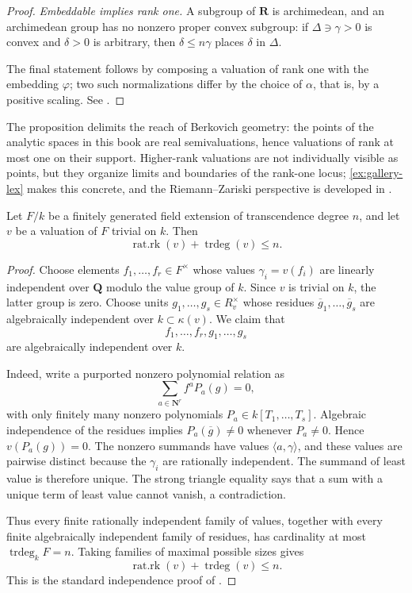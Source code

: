 \begin{proof}
\emph{Embeddable implies rank one.} A subgroup of $\mathbf R$ is
archimedean, and an archimedean group has no nonzero proper convex
subgroup: if $\Delta\ni\gamma>0$ is convex and $\delta>0$ is arbitrary,
then $\delta\leq n\gamma$ places $\delta$ in $\Delta$.

The final statement follows by composing a valuation of rank one with the
embedding $\varphi$; two such normalizations differ by the choice of
$\alpha$, that is, by a positive scaling. See
\cite[Chapter~VI, \S10]{ZariskiSamuelII}.
\end{proof}

The proposition delimits the reach of Berkovich geometry: the points of
the analytic spaces in this book are real semivaluations, hence valuations
of rank at most one on their support. Higher-rank valuations are not
individually visible as points, but they organize limits and boundaries of
the rank-one locus; \cref{ex:gallery-lex} makes this concrete, and the
Riemann--Zariski perspective is developed in \cite{Tem11}.

\begin{theorem}\label{thm:abhyankar-inequality}
Let $F/k$ be a finitely generated field extension of transcendence degree
$n$, and let $v$ be a valuation of $F$ trivial on $k$. Then
\[
       \operatorname{rat.rk}(v)+\operatorname{trdeg}(v)\leq n.
\]
\end{theorem}
\begin{proof}
Choose elements $f_1,\ldots,f_r\in F^\times$ whose values
$\gamma_i=v(f_i)$ are linearly independent over $\mathbf Q$ modulo the value
group of $k$.  Since $v$ is trivial on $k$, the latter group is zero.  Choose
units $g_1,\ldots,g_s\in R_v^\times$ whose residues
$\overline g_1,\ldots,\overline g_s$ are algebraically independent over
$k\subset\kappa(v)$.  We claim that
\[
                  f_1,\ldots,f_r,g_1,\ldots,g_s
\]
are algebraically independent over $k$.

Indeed, write a purported nonzero polynomial relation as
\[
                  \sum_{a\in\mathbf N^r} f^a P_a(g)=0,
\]
with only finitely many nonzero polynomials
$P_a\in k[T_1,\ldots,T_s]$.  Algebraic independence of the residues implies
$P_a(\overline g)\ne0$ whenever $P_a\ne0$.  Hence
$v(P_a(g))=0$.  The nonzero summands have values
$\langle a,\gamma\rangle$, and these values are pairwise distinct because
the $\gamma_i$ are rationally independent.  The summand of least value is
therefore unique.  The strong triangle equality
 says that a sum with a unique term of
least value cannot vanish, a contradiction.

Thus every finite rationally independent family of values, together with
every finite algebraically independent family of residues, has cardinality
at most $\operatorname{trdeg}_kF=n$.  Taking families of maximal possible
sizes gives
\[
 \operatorname{rat.rk}(v)+\operatorname{trdeg}(v)\le n.
\]
This is the standard independence proof of
\cite[Chapter~VI, \S10]{ZariskiSamuelII}.
\end{proof}

